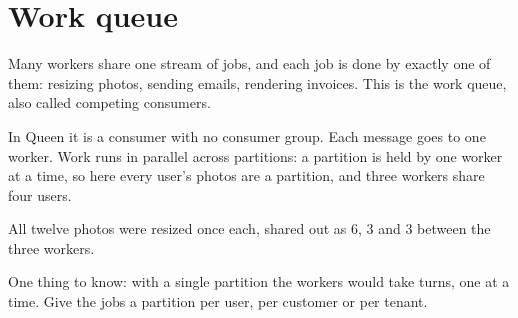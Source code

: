 %

\section{Work queue}

Many workers share one stream of jobs, and each job is done by exactly one of them: resizing
photos, sending emails, rendering invoices. This is the work queue, also called competing
consumers.

In Queen it is a consumer with no consumer group. Each message goes to one worker. Work runs in
parallel across partitions: a partition is held by one worker at a time, so here every user's
photos are a partition, and three workers share four users.



All twelve photos were resized once each, shared out as 6, 3 and 3 between the three workers.


One thing to know: with a single partition the workers would take turns, one at a time. Give the
jobs a partition per user, per customer or per tenant.
